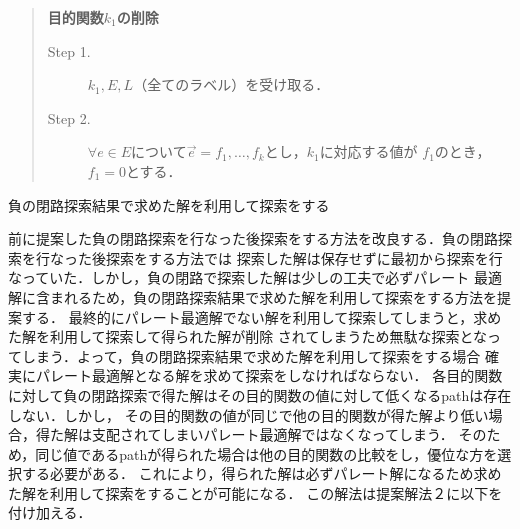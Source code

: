 \documentclass[12pt]{optlab-bachelor}
\begin{document}
\begin{quote}
  \textbf{目的関数$k_1$の削除}
  \begin{description}
    \item[Step 1.] $k_1,E,L$（全てのラベル）を受け取る．
    \item[Step 2.] $\forall e \in E$について$\vec{e}={f_1,\ldots,f_k}$とし，$k_1$に対応する値が
    $f_1$のとき，$f_1=0$とする．
  \end{description}
\end{quote}

\begin{description}
  \item[負の閉路探索結果で求めた解を利用して探索をする]
\end{description}

前に提案した負の閉路探索を行なった後探索をする方法を改良する．負の閉路探索を行なった後探索をする方法では
探索した解は保存せずに最初から探索を行なっていた．しかし，負の閉路で探索した解は少しの工夫で必ずパレート
最適解に含まれるため，負の閉路探索結果で求めた解を利用して探索をする方法を提案する．
最終的にパレート最適解でない解を利用して探索してしまうと，求めた解を利用して探索して得られた解が削除
されてしまうため無駄な探索となってしまう．よって，負の閉路探索結果で求めた解を利用して探索をする場合
確実にパレート最適解となる解を求めて探索をしなければならない．
各目的関数に対して負の閉路探索で得た解はその目的関数の値に対して低くなるpathは存在しない．しかし，
その目的関数の値が同じで他の目的関数が得た解より低い場合，得た解は支配されてしまいパレート最適解ではなくなってしまう．
そのため，同じ値であるpathが得られた場合は他の目的関数の比較をし，優位な方を選択する必要がある．
これにより，得られた解は必ずパレート解になるため求めた解を利用して探索をすることが可能になる．
この解法は提案解法２に以下を付け加える．
\end{document}
